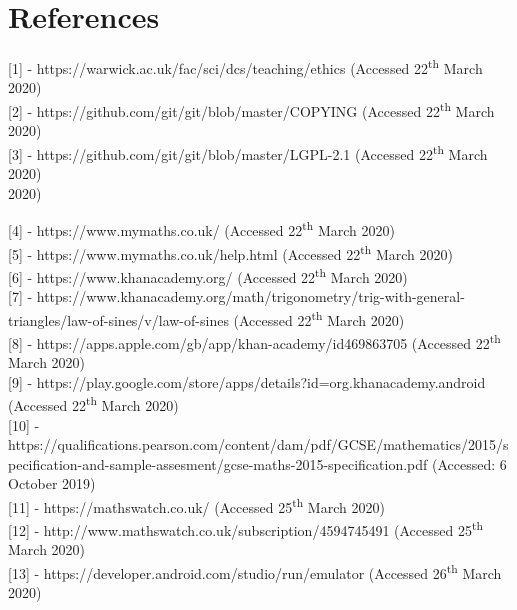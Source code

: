 \documentclass{article}
\begin{document}
\section{References}
\label{section:references}

[1] - https://warwick.ac.uk/fac/sci/dcs/teaching/ethics (Accessed 22\textsuperscript{th} March 2020) \\ 

[2] - https://github.com/git/git/blob/master/COPYING (Accessed 22\textsuperscript{th} March 2020) \\ 

[3] - https://github.com/git/git/blob/master/LGPL-2.1 (Accessed 22\textsuperscript{th} March 2020) \\  2020)

[4] - https://www.mymaths.co.uk/ (Accessed 22\textsuperscript{th} March 2020) \\ 

[5] - https://www.mymaths.co.uk/help.html (Accessed 22\textsuperscript{th} March 2020) \\

[6] - https://www.khanacademy.org/ (Accessed 22\textsuperscript{th} March 2020) \\

[7] - https://www.khanacademy.org/math/trigonometry/trig-with-general-triangles/law-of-sines/v/law-of-sines (Accessed 22\textsuperscript{th} March 2020) \\

[8] - https://apps.apple.com/gb/app/khan-academy/id469863705 (Accessed 22\textsuperscript{th} March 2020) \\ 

[9] - https://play.google.com/store/apps/details?id=org.khanacademy.android (Accessed 22\textsuperscript{th} March 2020) \\

[10] - https://qualifications.pearson.com/content/dam/pdf/GCSE/mathematics/2015/specification-and-sample-assesment/gcse-maths-2015-specification.pdf (Accessed: 6 October 2019) \\

[11] - https://mathswatch.co.uk/ (Accessed 25\textsuperscript{th} March 2020) \\

[12] - http://www.mathswatch.co.uk/subscription/4594745491 (Accessed 25\textsuperscript{th} March 2020) \\

[13] - https://developer.android.com/studio/run/emulator (Accessed 26\textsuperscript{th} March 2020) \\
\end{document}
